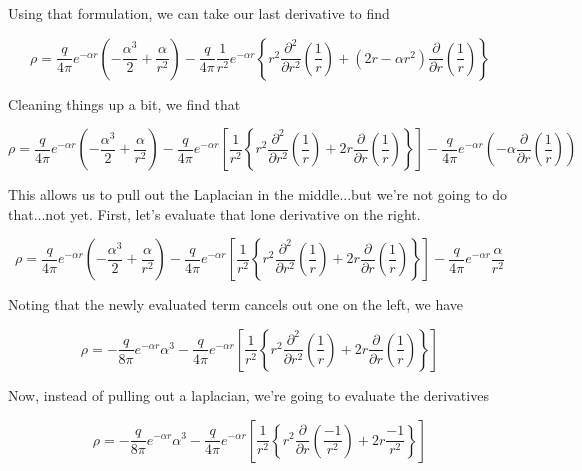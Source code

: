 Using that formulation, we can take our last derivative to find

\begin{equation}
  \rho
  = \frac{q}{4\pi}
  e^{-\alpha r}
  \left(
  - \frac{\alpha^3}{2}
  + \frac{\alpha}{r^2}
  \right)
  -\frac{q}{4\pi}  
  \frac{1}{r^2}
  e^{-\alpha r}
  \left\{
  r^2
  \frac{\partial^2}{\partial r^2}(\frac{1}{r})
  + \left( 2r - \alpha r^2 \right)
  \frac{\partial}{\partial r}\left(\frac{1}{r}\right)
  \right\}
\end{equation}

Cleaning things up a bit, we find that

\begin{equation}
  \rho
  = \frac{q}{4\pi}
  e^{-\alpha r}
  \left(
  - \frac{\alpha^3}{2}
  + \frac{\alpha}{r^2}
  \right)
  -\frac{q}{4\pi}  
  e^{-\alpha r}
  \left[
  \frac{1}{r^2}
  \left\{
  r^2 \frac{\partial^2}{\partial r^2}(\frac{1}{r})
  + 2r \frac{\partial}{\partial r}\left(\frac{1}{r}\right)
  \right\}
  \right]
  -\frac{q}{4\pi}  
  e^{-\alpha r}
  \left(-\alpha \frac{\partial}{\partial r}\left(\frac{1}{r}\right) \right)
\end{equation}

This allows us to pull out the Laplacian in the middle...but we're not
going to do that...not yet.  First, let's evaluate that lone
derivative on the right.

\begin{equation}
  \rho
  = \frac{q}{4\pi}
  e^{-\alpha r}
  \left(
  - \frac{\alpha^3}{2}
  + \frac{\alpha}{r^2}
  \right)
  -\frac{q}{4\pi}  
  e^{-\alpha r}
  \left[
  \frac{1}{r^2}
  \left\{
  r^2 \frac{\partial^2}{\partial r^2}(\frac{1}{r})
  + 2r \frac{\partial}{\partial r}\left(\frac{1}{r}\right)
  \right\}
  \right]
  -\frac{q}{4\pi}  
  e^{-\alpha r}
  \frac{\alpha}{r^2}
\end{equation}

Noting that the newly evaluated term cancels out one on the left, we have

\begin{equation}
  \rho
  = - \frac{q}{8\pi}
  e^{-\alpha r}
  \alpha^3
  -\frac{q}{4\pi}  
  e^{-\alpha r}
  \left[
  \frac{1}{r^2}
  \left\{
  r^2 \frac{\partial^2}{\partial r^2}(\frac{1}{r})
  + 2r \frac{\partial}{\partial r}\left(\frac{1}{r}\right)
  \right\}
  \right]
\end{equation}

Now, instead of pulling out a laplacian, we're going to evaluate the
derivatives

\begin{equation}
  \rho
  = - \frac{q}{8\pi}
  e^{-\alpha r}
  \alpha^3
  -\frac{q}{4\pi}  
  e^{-\alpha r}
  \left[
  \frac{1}{r^2}
  \left\{
  r^2 \frac{\partial}{\partial r}(\frac{-1}{r^2})
  + 2r \frac{-1}{r^2}
  \right\}
  \right]
\end{equation}

